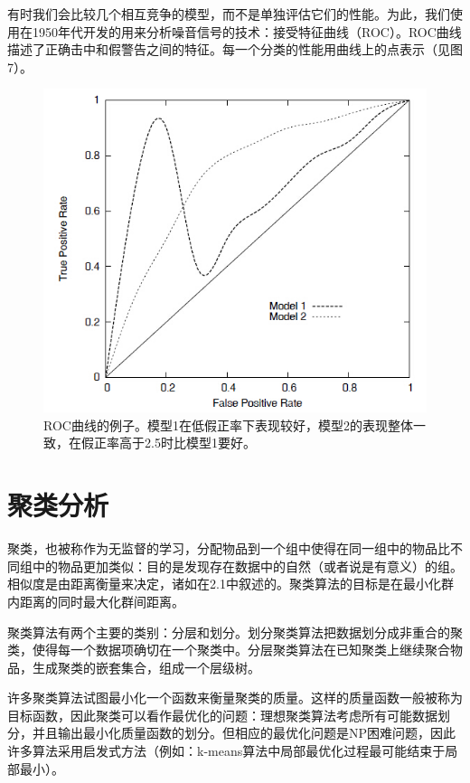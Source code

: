 \documentclass{article}
\begin{document}
有时我们会比较几个相互竞争的模型，而不是单独评估它们的性能。为此，我们使用在1950年代开发的用来分析噪音信号的技术：接受特征曲线（ROC）。ROC曲线描述了正确击中和假警告之间的特征。每一个分类的性能用曲线上的点表示（见图7）。
\begin{figure}[!htb]
	  \begin{center}
	  	\includegraphics[scale=0.5]{f2.7.jpg}
	  	\caption{ROC曲线的例子。模型1在低假正率下表现较好，模型2的表现整体一致，在假正率高于2.5时比模型1要好。}
	  \end{center}
\end{figure}

\section{聚类分析}
聚类，也被称作为无监督的学习，分配物品到一个组中使得在同一组中的物品比不同组中的物品更加类似：目的是发现存在数据中的自然（或者说是有意义）的组。相似度是由距离衡量来决定，诸如在2.1中叙述的。聚类算法的目标是在最小化群内距离的同时最大化群间距离。

聚类算法有两个主要的类别：分层和划分。划分聚类算法把数据划分成非重合的聚类，使得每一个数据项确切在一个聚类中。分层聚类算法在已知聚类上继续聚合物品，生成聚类的嵌套集合，组成一个层级树。

许多聚类算法试图最小化一个函数来衡量聚类的质量。这样的质量函数一般被称为目标函数，因此聚类可以看作最优化的问题：理想聚类算法考虑所有可能数据划分，并且输出最小化质量函数的划分。但相应的最优化问题是NP困难问题，因此许多算法采用启发式方法（例如：k-means算法中局部最优化过程最可能结束于局部最小）。
\end{document}
